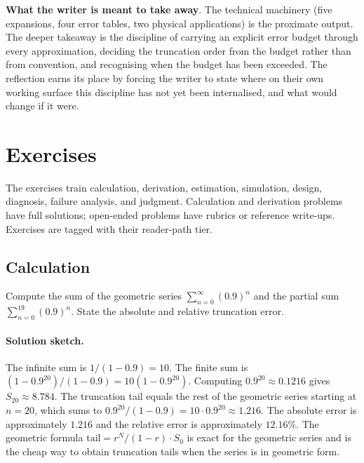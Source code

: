 \begin{project}
\textbf{What the writer is meant to take away}. The technical
machinery (five expansions, four error tables, two physical
applications) is the proximate output. The deeper takeaway is the
discipline of carrying an explicit error budget through every
approximation, deciding the truncation order from the budget rather
than from convention, and recognising when the budget has been
exceeded. The reflection earns its place by forcing the writer to
state where on their own working surface this discipline has not yet
been internalised, and what would change if it were.
\end{project}

\section{Exercises}

The exercises train calculation, derivation, estimation, simulation,
design, diagnosis, failure analysis, and judgment. Calculation and
derivation problems have full solutions; open-ended problems have
rubrics or reference write-ups. Exercises are tagged with their
reader-path tier.

\subsection*{Calculation}

\begin{exercise}
Compute the sum of the geometric series
$\sum_{n=0}^{\infty} (0.9)^{n}$ and the partial sum
$\sum_{n=0}^{19} (0.9)^{n}$. State the absolute and relative
truncation error.

\paragraph{Solution sketch.} The infinite sum is $1/(1 - 0.9) = 10$.
The finite sum is $(1 - 0.9^{20})/(1 - 0.9) = 10 (1 - 0.9^{20})$.
Computing $0.9^{20} \approx 0.1216$ gives $S_{20} \approx 8.784$.
The truncation tail equals the rest of the geometric series starting
at $n = 20$, which sums to $0.9^{20}/(1 - 0.9) = 10 \cdot 0.9^{20}
\approx 1.216$. The absolute error is approximately $1.216$ and the
relative error is approximately $12.16\%$. The geometric formula
$\text{tail} = r^{N}/(1 - r) \cdot S_{0}$ is exact for the geometric
series and is the cheap way to obtain truncation tails when the
series is in geometric form.
\end{exercise}

